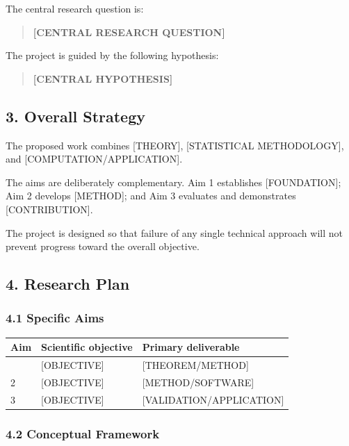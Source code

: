 \documentclass[
  11pt,
  letterpaper,
]{article}
\begin{document}
The central research question is:

\begin{quote}
\textbf{{[}CENTRAL RESEARCH QUESTION{]}}
\end{quote}

The project is guided by the following hypothesis:

\begin{quote}
\textbf{{[}CENTRAL HYPOTHESIS{]}}
\end{quote}

\subsection{3. Overall Strategy}\label{overall-strategy}

The proposed work combines {[}THEORY{]}, {[}STATISTICAL METHODOLOGY{]},
and {[}COMPUTATION/APPLICATION{]}.

The aims are deliberately complementary. Aim 1 establishes
{[}FOUNDATION{]}; Aim 2 develops {[}METHOD{]}; and Aim 3 evaluates and
demonstrates {[}CONTRIBUTION{]}.

The project is designed so that failure of any single technical approach
will not prevent progress toward the overall objective.

\subsection{4. Research Plan}\label{research-plan}

\subsubsection{4.1 Specific Aims}\label{specific-aims}

\begin{longtable}[]{@{}lll@{}}
\toprule\noalign{}
Aim & Scientific objective & Primary deliverable \\
\midrule\noalign{}
\endhead
\bottomrule\noalign{}
\endlastfoot
1 & {[}OBJECTIVE{]} & {[}THEOREM/METHOD{]} \\
2 & {[}OBJECTIVE{]} & {[}METHOD/SOFTWARE{]} \\
3 & {[}OBJECTIVE{]} & {[}VALIDATION/APPLICATION{]} \\
\end{longtable}

\subsubsection{4.2 Conceptual Framework}\label{conceptual-framework}
\end{document}

